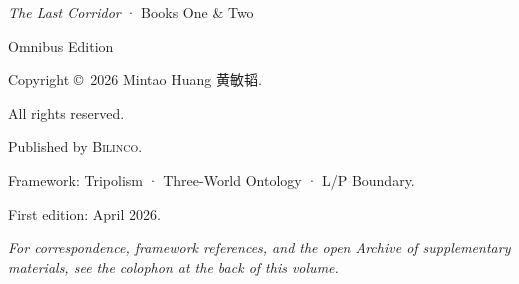 \thispagestyle{empty}
\vspace*{\fill}
\begin{flushleft}\footnotesize\color{ink}
\textit{The Last Corridor} \enspace · \enspace Books One \& Two\par
Omnibus Edition\par
\vspace{1em}
Copyright \copyright\ 2026 Mintao Huang \enspace 黄敏韬.\par
All rights reserved.\par
\vspace{1em}
Published by \textsc{Bilinco}.\par
Framework: Tripolism \enspace · \enspace Three-World Ontology \enspace · \enspace L/P Boundary.\par
\vspace{1em}
First edition: April 2026.\par
\vspace{2em}
\textit{For correspondence, framework references, and the open Archive of supplementary materials, see the colophon at the back of this volume.}\par
\end{flushleft}
\vspace*{\fill}
